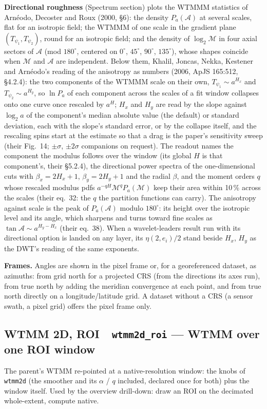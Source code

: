 \documentclass[10pt]{article}
\newcommand{\dev}[1]{\texttt{#1}}
\newcommand{\tool}[2]{#1~\textperiodcentered~\dev{#2}}
\begin{document}
\textbf{Directional roughness} (Spectrum section) plots the WTMMM statistics of Arn\'eodo, Decoster and
Roux (2000, \S6): the density $P_a(\mathcal{A})$ at several scales, flat for an isotropic
field; the WTMMM of one scale in the gradient plane $(T_{\psi_1},T_{\psi_2})$, round for an
isotropic field; and the density of $\log_2\mathcal{M}$ in four axial sectors of
$\mathcal{A}$ (mod $180^\circ$, centered on $0^\circ$, $45^\circ$, $90^\circ$, $135^\circ$),
whose shapes coincide when $\mathcal{M}$ and $\mathcal{A}$ are independent. Below them, Khalil,
Joncas, Nekka, Kestener and Arn\'eodo's reading of the anisotropy as numbers (2006, ApJS 165:512,
\S4.2.4): the two components of the WTMMM scale on their own, $T_{\psi_1}\sim a^{H_x}$ and
$T_{\psi_2}\sim a^{H_y}$, so $\ln P_a$ of each component across the scales of a fit window collapses
onto one curve once rescaled by $a^{H}$; $H_x$ and $H_y$ are read by the slope against $\log_2 a$ of
the component's median absolute value (the default) or standard deviation, each with the slope's
standard error, or by the collapse itself, and the rescaling spins start at the estimate so that a
drag is the paper's sensitivity sweep (their Fig.~14; $\pm\sigma$, $\pm2\sigma$ companions on
request). The readout names the component the modulus follows over the window (its global $H$
is that component's, their \S5.2.4), the directional power spectra of the one-dimensional cuts
with $\beta_x=2H_x+1$, $\beta_y=2H_y+1$ and the radial $\beta$, and the moment orders $q$ whose
rescaled modulus pdfs $a^{-qH}\mathcal{M}^qP_a(\mathcal{M})$ keep their area within 10\,\% across
the scales (their eq.~32: the $q$ the partition functions can carry). The anisotropy against scale
is the peak of $P_a(\mathcal{A})$ modulo $180^\circ$: its height over the isotropic level and its
angle, which sharpens and turns toward fine scales as $\tan\mathcal{A}\sim a^{H_y-H_x}$ (their
eq.~38). When a wavelet-leaders result run with its directional option is landed on any layer,
its $\eta(2,e_i)/2$ stand beside $H_x$, $H_y$ as the DWT's reading of the same exponents.

\textbf{Frames.} Angles are shown in the pixel frame or, for a georeferenced dataset, as
azimuths: from grid north for a projected CRS (from the directions its axes run), from true
north by adding the meridian convergence at each point, and from true north directly on a
longitude/latitude grid. A dataset without a CRS (a sensor swath, a pixel grid) offers the
pixel frame only.

\subsection{\tool{WTMM 2D, ROI}{wtmm2d\_roi} --- WTMM over one ROI window}
The parent's WTMM re-pointed at a native-resolution window: the knobs of \dev{wtmm2d}
(the smoother and its $\alpha$ / $q$ included, declared once for both) plus
the window itself. Used by the overview
drill-down: draw an ROI on the decimated whole-extent, compute native.
\end{document}
